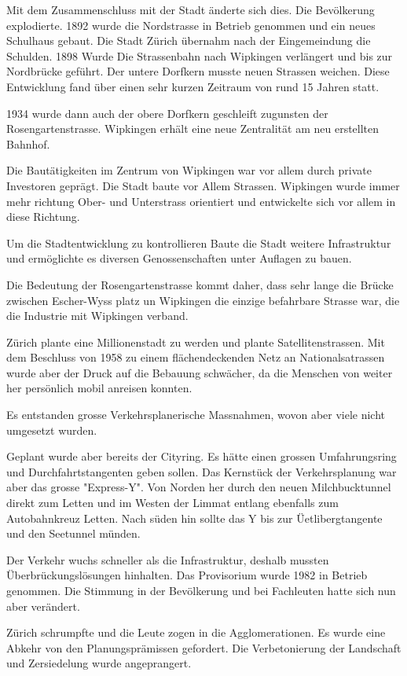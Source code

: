 \documentclass[a4paper,11pt,ngerman]{article}
\begin{document}
Mit dem Zusammenschluss mit der Stadt änderte sich dies. Die Bevölkerung
explodierte. 1892 wurde die Nordstrasse in Betrieb genommen und ein neues
Schulhaus gebaut. Die Stadt Zürich übernahm nach der Eingemeindung die
Schulden. 1898 Wurde Die Strassenbahn nach Wipkingen verlängert und bis zur
Nordbrücke geführt. Der untere Dorfkern musste neuen Strassen weichen. Diese
Entwicklung fand über einen sehr kurzen Zeitraum von rund 15 Jahren statt.

1934 wurde dann auch der obere Dorfkern geschleift zugunsten der
Rosengartenstrasse. Wipkingen erhält eine neue Zentralität am neu erstellten
Bahnhof.

Die Bautätigkeiten im Zentrum von Wipkingen war vor allem durch private
Investoren geprägt. Die Stadt baute vor Allem Strassen. Wipkingen wurde
immer mehr richtung Ober- und Unterstrass orientiert und entwickelte sich
vor allem in diese Richtung.

Um die Stadtentwicklung zu kontrollieren Baute die Stadt weitere
Infrastruktur und ermöglichte es diversen Genossenschaften unter Auflagen zu
bauen.

Die Bedeutung der Rosengartenstrasse kommt daher, dass sehr lange die Brücke
zwischen Escher-Wyss platz un Wipkingen die einzige befahrbare Strasse war,
die die Industrie mit Wipkingen verband.

Zürich plante eine Millionenstadt zu werden und plante
Satellitenstrassen. Mit dem Beschluss von 1958 zu einem flächendeckenden
Netz an Nationalsatrassen wurde aber der Druck auf die Bebauung schwächer,
da die Menschen von weiter her persönlich mobil anreisen konnten.

Es entstanden grosse Verkehrsplanerische Massnahmen, wovon aber viele nicht
umgesetzt wurden.

Geplant wurde aber bereits der Cityring. Es hätte einen grossen
Umfahrungsring und Durchfahrtstangenten geben sollen. Das Kernstück der
Verkehrsplanung war aber das grosse "Express-Y". Von Norden her durch den
neuen Milchbucktunnel direkt zum Letten und im Westen der Limmat entlang
ebenfalls zum Autobahnkreuz Letten. Nach süden hin sollte das Y bis zur
Üetlibergtangente und den Seetunnel münden.

Der Verkehr wuchs schneller als die Infrastruktur, deshalb mussten
Überbrückungslösungen hinhalten. Das Provisorium wurde 1982 in Betrieb
genommen. Die Stimmung in der Bevölkerung und bei Fachleuten hatte sich nun
aber verändert.

Zürich schrumpfte und die Leute zogen in die Agglomerationen. Es wurde eine
Abkehr von den Planungsprämissen gefordert. Die Verbetonierung der
Landschaft und Zersiedelung wurde angeprangert.
\end{document}

